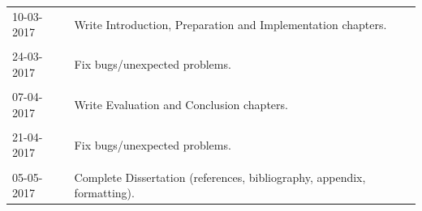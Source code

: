\documentclass[12pt]{article}
\begin{document}
\begin{tabular}{ll }
	10-03-2017	&	Write Introduction, Preparation and Implementation chapters. \\ \\

    24-03-2017	&	Fix bugs/unexpected problems. \\ \\
    
    07-04-2017	&	Write Evaluation and Conclusion chapters. \\ \\

    21-04-2017	&	Fix bugs/unexpected problems. \\ \\
    
	05-05-2017	&	Complete Dissertation (references, bibliography, appendix, formatting). \\

  \bottomrule

\end{tabular}

\ifwhole \else

  \newpage
  
  
  \cleardoublepage{}

\fi
\end{document}
